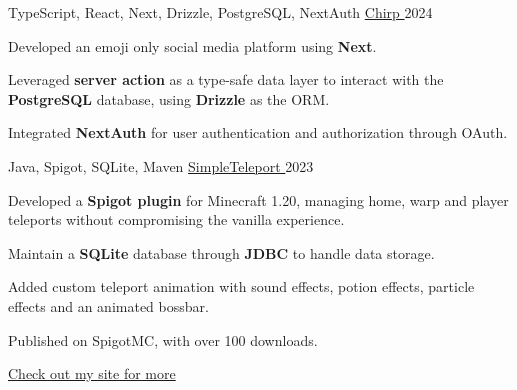 

\begin{cventries}
\cventry
{TypeScript, React, Next, Drizzle, PostgreSQL, NextAuth} %
{\href{https://chirp-one-amber.vercel.app/}{Chirp {\faLink}}} %
{} %
{2024} %
{
  \begin{cvitems} %
    \item {Developed an emoji only social media platform using \textbf{Next}.}
    \item {Leveraged \textbf{server action} as a type-safe data layer to interact with the \textbf{PostgreSQL} database, using \textbf{Drizzle} as the ORM.}
    \item {Integrated \textbf{NextAuth} for user authentication and authorization through OAuth.}
  \end{cvitems}
}

  \cventry
    {Java, Spigot, SQLite, Maven} %
    {\href{https://github.com/shiqui/simple-teleport}{SimpleTeleport {\faLink}}} %
    {} %
    {2023} %
    {
      \begin{cvitems} %
        \item {Developed a \textbf{Spigot plugin} for Minecraft 1.20, managing home, warp and player teleports without compromising the vanilla experience.}
        \item {Maintain a \textbf{SQLite} database through \textbf{JDBC} to handle data storage.}
        \item {Added custom teleport animation with sound effects, potion effects, particle effects and an animated bossbar.}
        \item {Published on SpigotMC, with over 100 downloads.}
      \end{cvitems}
    }
    
\href{https://shiqui.me/projects}{Check out my site for more {\faLink}}


\end{cventries}
